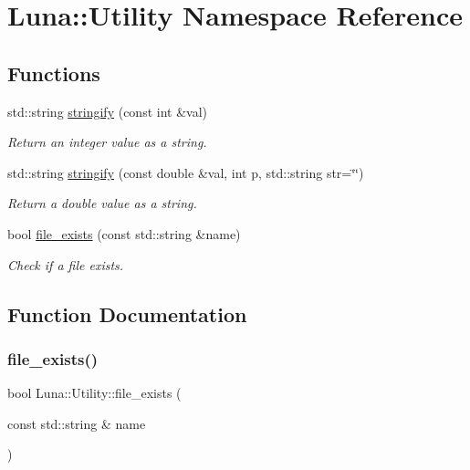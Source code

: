 \hypertarget{namespaceLuna_1_1Utility}{}\section{Luna\+:\+:Utility Namespace Reference}
\label{namespaceLuna_1_1Utility}
\subsection*{Functions}
\begin{DoxyCompactItemize}
\item 
std\+::string \hyperlink{namespaceLuna_1_1Utility_a7a21ee8e724765b7a018b6a5394b7e9c}{stringify} (const int \&val)
\begin{DoxyCompactList}\small\item\em Return an integer value as a string. \end{DoxyCompactList}\item 
std\+::string \hyperlink{namespaceLuna_1_1Utility_a850960749d7a65b38a75b9a44d44f459}{stringify} (const double \&val, int p, std\+::string str=\char`\"{}\char`\"{})
\begin{DoxyCompactList}\small\item\em Return a double value as a string. \end{DoxyCompactList}\item 
bool \hyperlink{namespaceLuna_1_1Utility_a3bc8335509b9f18b19196c9621af5b5f}{file\+\_\+exists} (const std\+::string \&name)
\begin{DoxyCompactList}\small\item\em Check if a file exists. \end{DoxyCompactList}\end{DoxyCompactItemize}


\subsection{Function Documentation}
\mbox{\label{namespaceLuna_1_1Utility_a3bc8335509b9f18b19196c9621af5b5f}} 
\subsubsection{\texorpdfstring{file\+\_\+exists()}{file\_exists()}}
{\footnotesize\ttfamily bool Luna\+::\+Utility\+::file\+\_\+exists (\begin{DoxyParamCaption}\item[{const std\+::string \&}]{name }\end{DoxyParamCaption})}



